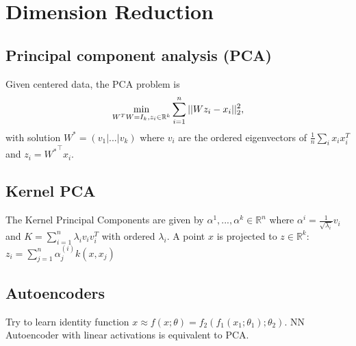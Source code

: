 \section*{Dimension Reduction}
\subsection*{Principal component analysis (PCA)}
Given centered data, the PCA problem is 
$$\min_{W^TW=I_k,z_i\in\mathbb{R}^k}\sum_{i=1}^n||W z_i - x_i||_2^2,$$
with solution $W^* = (v_1|...|v_k)$ where $v_i$ are the ordered 
eigenvectors of $\frac{1}{n}\sum_ix_ix_i^T$ 
and $z_i = {W^*}^\top x_i$. 

\subsection*{Kernel PCA}
The Kernel Principal Components are given by $\alpha^{1},...,\alpha^{k}\in \mathbb{R}^n$ 
where $\alpha^{i} = \frac{1}{\sqrt{\lambda_i}}v_i$ and 
$K = \sum_{i=1}^n \lambda_i v_i v_i^T$ with ordered $\lambda_i.$ A point 
$x$ is projected to $z \in \mathbb{R}^k$:
$z_i = \sum_{j=1}^n\alpha_j^{(i)}k(x,x_j)$

\subsection*{Autoencoders}
Try to learn identity function $x \approx f(x;\theta)
= f_2(f_1(x_1;\theta_1);\theta_2)$. NN Autoencoder with 
linear activations is equivalent to PCA.
\\